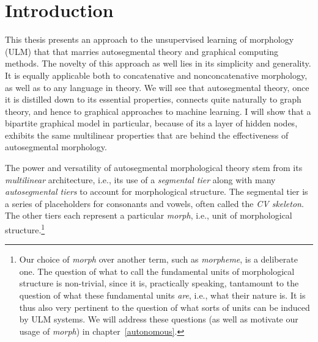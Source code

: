 \chapter{Introduction}\label{ch:intro}

This thesis presents an approach to the unsupervised learning of morphology (ULM) that 
that marries autosegmental theory \citep{mccarthy:1981} and graphical 
computing methods. The novelty of this approach as well
lies in its simplicity and generality. It is equally applicable both to concatenative and 
nonconcatenative morphology, as well as to any language in theory. We will see that
autosegmental theory, once it is distilled down to its essential properties, 
connects quite naturally to graph theory, and hence to graphical approaches 
to machine learning. I will show that a bipartite graphical model in particular, 
because of its a layer of hidden nodes, exhibits the same multilinear properties 
that are behind the effectiveness of autosegmental morphology. 

The power and versatility of autosegmental morphological theory \citep{mccarthy:1981}
stem from its \emph{multilinear} architecture, i.e., its
use of a \emph{segmental tier} along with many \emph{autosegmental tiers} 
to account for morphological structure. The segmental tier is
a series of placeholders for consonants and vowels, often called the
\emph{CV skeleton}. The other tiers each represent a particular \emph{morph}, i.e., unit of morphological structure.\footnote{Our choice of \emph{morph} over another term, such as \emph{morpheme}, is a deliberate  one. The question of what to call the fundamental units of morphological structure is non-trivial, since it is, practically speaking, tantamount to the question of what these fundamental units \emph{are}, i.e., what their nature is. It is thus also very pertinent to the question of what sorts of units can be induced by ULM systems. We will address these questions (as well as motivate our usage of \emph{morph}) in chapter~\ref{autonomous}.}
 
